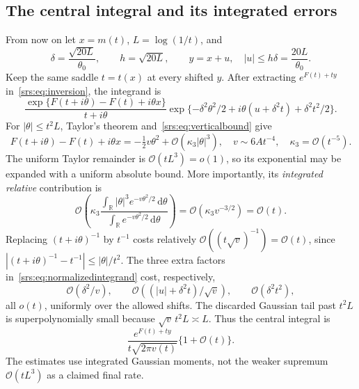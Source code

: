 \documentclass[11pt]{article}
\numberwithin{equation}{section}
\theoremstyle{remark}\newtheorem{remark}[theorem]{Remark}
\newcommand{\Oh}{\mathcal O}
\newcommand{\dd}{\,\mathrm d}
\newcommand{\R}{\mathbb R}
\begin{document}
\subsection{The central integral and its integrated errors}
From now on let $x=m(t)$, $L=\log(1/t)$, and
\begin{equation}
 \delta=\frac{\sqrt{20L}}{\theta_0},\qquad h=\sqrt{20L},\qquad
 y=x+u,\quad |u|\le h\delta=\frac{20L}{\theta_0}.
 \label{srs:eq:smoothingchoice}
\end{equation}
Keep the same saddle $t=t(x)$ at every shifted $y$. After extracting $e^{F(t)+ty}$ in~\eqref{srs:eq:inversion}, the integrand is
\begin{equation}
 \frac{\exp\{F(t+i\theta)-F(t)+i\theta x\}}
 {t+i\theta}
 \exp\{-\delta^2\theta^2/2+i\theta(u+\delta^2t)+\delta^2t^2/2\}.
 \label{srs:eq:normalizedintegrand}
\end{equation}
For $|\theta|\le t^2L$, Taylor's theorem and~\eqref{srs:eq:verticalbound} give
\begin{equation}
 F(t+i\theta)-F(t)+i\theta x
 =-\tfrac12v\theta^2+\Oh(\kappa_3|\theta|^3),\quad
 v\sim6At^{-4},\quad \kappa_3=\Oh(t^{-5}).\label{srs:eq:Taylor}
\end{equation}
The uniform Taylor remainder is $\Oh(tL^3)=o(1)$, so its exponential may be expanded with a uniform absolute bound. More importantly, its \emph{integrated relative} contribution is
\begin{equation}
 \Oh\left(\kappa_3\frac{\int_\R |\theta|^3e^{-v\theta^2/2}\dd\theta}
 {\int_\R e^{-v\theta^2/2}\dd\theta}\right)
 =\Oh(\kappa_3v^{-3/2})=\Oh(t).\label{srs:eq:integratedcubic}
\end{equation}
Replacing $(t+i\theta)^{-1}$ by $t^{-1}$ costs relatively
$\Oh((t\sqrt v)^{-1})=\Oh(t)$, since
$|(t+i\theta)^{-1}-t^{-1}|\le|\theta|/t^2$.
The three extra factors in~\eqref{srs:eq:normalizedintegrand} cost, respectively,
\begin{equation}
 \Oh(\delta^2/v),\qquad
 \Oh((|u|+\delta^2t)/\sqrt v),\qquad
 \Oh(\delta^2t^2),\label{srs:eq:extrafactors}
\end{equation}
all $o(t)$, uniformly over the allowed shifts. The discarded Gaussian tail past $t^2L$ is superpolynomially small because $\sqrt v\,t^2L\asymp L$. Thus the central integral is
\begin{equation}
 \frac{e^{F(t)+ty}}{t\sqrt{2\pi v(t)}}\{1+\Oh(t)\}.
 \label{srs:eq:central}
\end{equation}
The estimates use integrated Gaussian moments, not the weaker supremum $\Oh(tL^3)$ as a claimed final rate.
\end{document}
